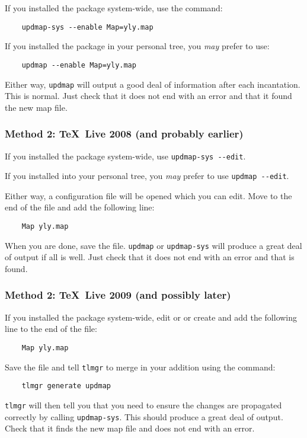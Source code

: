 \documentclass[11pt,british]{article}
\begin{document}
If you installed the package system-wide, use the command:
\begin{verbatim}
	updmap-sys --enable Map=yly.map
\end{verbatim}
If you installed the package in your personal tree, you \emph{may} prefer to use:
\begin{verbatim}
	updmap --enable Map=yly.map
\end{verbatim}

Either way, \verb|updmap| will output a good deal of information after each incantation. This is normal. Just check that it does not end with an error and that it found the new map file.

\subsubsection{Method 2: \TeX~Live 2008 (and probably earlier)}

If you installed the package system-wide, use \verb|updmap-sys --edit|.

If you installed into your personal tree, you \emph{may} prefer to use	\verb|updmap --edit|.

Either way, a configuration file will be opened which you can edit. Move to the end of the file and add the following line:
\begin{verbatim}
	Map yly.map
\end{verbatim}
When you are done, save the file. \verb|updmap| or \verb|updmap-sys| will produce a great deal of output if all is well. Just check that it does not end with an error and that  is found.

\subsubsection{Method 2: \TeX~Live 2009 (and possibly later)}

If you installed the package system-wide, edit or or create  and add the following line to the end of the file:
\begin{verbatim}
	Map yly.map
\end{verbatim}
Save the file and tell \verb|tlmgr| to merge in your addition using the command:
\begin{verbatim}
	tlmgr generate updmap
\end{verbatim}
\verb|tlmgr| will then tell you that you need to ensure the changes are propagated correctly by calling \verb|updmap-sys|. This should produce a great deal of output. Check that it finds the new map file and does not end with an error.
\end{document}

